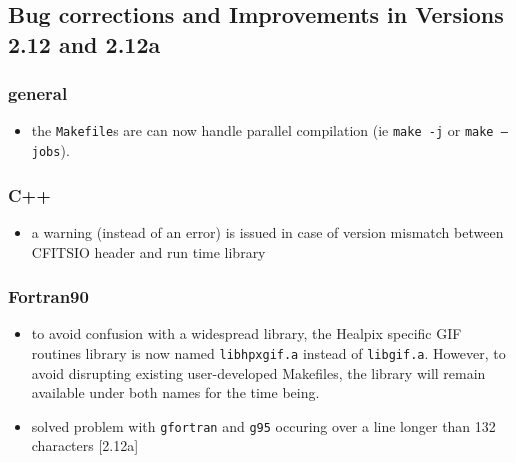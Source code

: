 \documentclass[12pt,twoside]{article}
\begin{document}
\subsection{Bug corrections and Improvements in Versions 2.12 and 2.12a} %
%
\subsubsection[New General Improvements]{general}
\begin{itemize}
	\item the {\tt Makefile}s are can now handle parallel compilation
(ie {\tt make -j} or {\tt make --jobs}).
\end{itemize}


\subsubsection[C++]{C++}
	\begin{itemize}
	\item a warning (instead of an error) is issued in case of version
mismatch between CFITSIO header and run time library
	\end{itemize}

\subsubsection[Fortran90]{Fortran90}
	\begin{itemize}
	\item to avoid confusion with a widespread library, 
	the Healpix specific GIF routines library is now named {\tt libhpxgif.a} instead of
	{\tt libgif.a}. However, to avoid disrupting existing user-developed
	Makefiles, the library will remain available under both names
for the time being.
	\item solved problem with {\tt gfortran} and {\tt g95}
occuring over a line longer than 132 characters [2.12a]
	\end{itemize}
\end{document}

